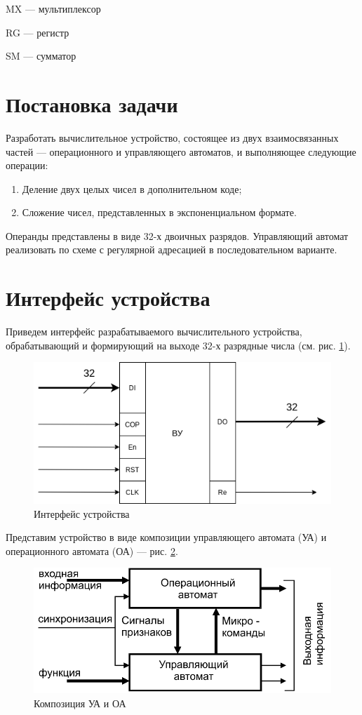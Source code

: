 \documentclass[a4paper,14pt]{extarticle}
\begin{document}
 MX		---	мультиплексор
 
 RG		---	регистр
 
 
 SM		---	сумматор
\section{Постановка задачи}
Разработать вычислительное устройство, состоящее из  двух взаимосвязанных частей --- операционного и управляющего автоматов, и выполняющее следующие операции:
\begin{enumerate}
	\item Деление двух целых чисел в дополнительном коде;
	\item Сложение чисел, представленных в экспоненциальном формате.
\end{enumerate}
Операнды представлены в виде 32-х двоичных разрядов. Управляющий автомат реализовать по схеме с регулярной адресацией в последовательном варианте.
\section{Интерфейс устройства}
\label{sec:interface}
Приведем интерфейс разрабатываемого вычислительного устройства, обрабатывающий и формирующий на выходе 32-х разрядные числа (см. рис. \ref{fig:courseinterface}).
\begin{figure}[h!]
	\centering
	\includegraphics[width=0.7\linewidth]{images/course_interface}
	\caption{Интерфейс устройства}
	\label{fig:courseinterface}
\end{figure}
Представим устройство в виде композиции управляющего автомата (УА) и операционного автомата (ОА) --- рис. \ref{fig:courseinterfaceoama}.
\begin{figure}[h!]
	\centering
	\includegraphics[width=0.7\linewidth]{images/course_interface_oa_ma}
	\caption{Композиция УА и ОА}
	\label{fig:courseinterfaceoama}
\end{figure}
\end{document}
